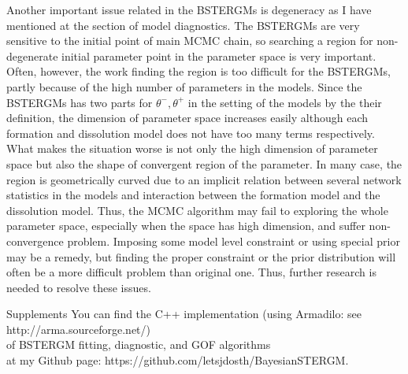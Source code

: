 \documentclass[aspectratio=169,ignorenonframetext,9pt]{beamer}
\theoremstyle{plain}
\theoremstyle{definition}
\begin{document}
Another important issue related in the BSTERGMs is degeneracy as I have mentioned at the section of model diagnostics.
The BSTERGMs are very sensitive to the initial point of main MCMC chain, so
searching a region for non-degenerate initial parameter point in the parameter space is very important.
Often, however, the work finding the region is too difficult for the BSTERGMs,
partly because of the high number of parameters in the models.
Since the BSTERGMs has two parts for $\theta^-, \theta^+$ in the setting of the models by the their definition,
the dimension of parameter space increases easily although each formation and dissolution model does not have
too many terms respectively.
What makes the situation worse is not only the high dimension of parameter space but also the shape of convergent region of the parameter.
In many case, the region is geometrically curved due to an implicit relation between several network statistics in the models
and interaction between the formation model and the dissolution model.
Thus, the MCMC algorithm may fail to exploring the whole parameter space, especially when the space has high dimension,
and suffer non-convergence problem.
Imposing some model level constraint or using special prior may be a remedy,
but finding the proper constraint or the prior distribution will often be a more difficult problem than original one.
Thus, further research is needed to resolve these issues.


\begin{frame}{Supplements}
    You can find the C++ implementation (using Armadilo: see http://arma.sourceforge.net/)
    \\ of BSTERGM fitting, diagnostic, and GOF algorithms
    \\ at my Github page: https://github.com/letsjdosth/BayesianSTERGM.
\end{frame}



\nocite{*}


\end{document}
